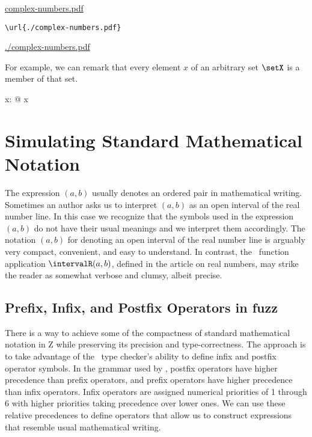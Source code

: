 \documentclass{amsart}
\begin{document}
\url{complex-numbers.pdf}

\begin{verbatim}
\url{./complex-numbers.pdf}
\end{verbatim}

\url{./complex-numbers.pdf}


For example, we can remark that every element $x$ of an arbitrary set $\setX$ is a member of that set.

\begin{remark}

\begin{zed}
	\forall x: \setX @ x \in \setX
\end{zed}

\end{remark}

\section{Simulating Standard Mathematical Notation}

The expression $(a,b)$ usually denotes an ordered pair in mathematical writing.
Sometimes an author asks us to interpret $(a,b)$ as an open interval of the real number line.
In this case we recognize that the symbols used in the expression $(a,b)$ do not have their usual meanings
and we interpret them accordingly.
The notation $(a,b)$ for denoting an open interval of the real number line is
arguably very compact, convenient, and easy to understand. 
In contrast, the \ZN\  function application $\intervalR(a,b)$, defined in the article on real numbers,
may strike the reader as somewhat verbose and clumsy, albeit precise.

\subsection{Prefix, Infix, and Postfix Operators in fuzz}

There is a way to achieve some of the compactness of standard mathematical notation in Z while
preserving its precision and type-correctness.
The approach is to take advantage of the \fuzz\ type checker's ability to define infix and postfix 
operator symbols. 
In the grammar used by \fuzz, postfix operators have higher precedence than prefix operators,
and prefix operators have higher precedence than infix operators.
Infix operators are assigned numerical priorities of 1 through 6 with higher priorities taking precedence 
over lower ones.
We can use these relative precedences to define operators that allow us to construct expressions 
that resemble usual mathematical writing.
\end{document}
